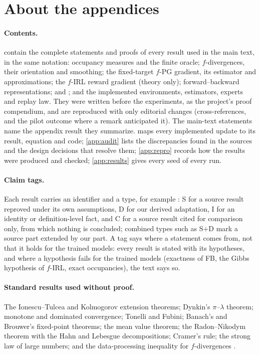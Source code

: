 \section{About the appendices}\label{app:proofs-intro}

\paragraph{Contents.}
 contain the complete statements and proofs of every result used in the main text, in the same notation: occupancy measures and the finite oracle; $f$-divergences, their orientation and smoothing; the fixed-target $f$-PG gradient, its estimator and approximations; the $f$-IRL reward gradient (theory only); forward--backward representations; \ERFB{} and \DMFB; and the implemented environments, estimators, experts and replay law.
They were written before the experiments, as the project's proof compendium, and are reproduced with only editorial changes (cross-references, and the pilot outcome where a remark anticipated it).
The main-text statements name the appendix result they summarize.
 maps every implemented update to its result, equation and code; \cref{app:audit} lists the discrepancies found in the sources and the design decisions that resolve them; \cref{app:repro} records how the results were produced and checked; \cref{app:results} gives every seed of every run.

\paragraph{Claim tags.}
Each result carries an identifier and a type, for example : \textsf{S} for a source result reproved under its own assumptions, \textsf{D} for our derived adaptation, \textsf{I} for an identity or definition-level fact, and \textsf{C} for a source result cited for comparison only, from which nothing is concluded; combined types such as \textsf{S+D} mark a source part extended by our part.
A tag says where a statement comes from, not that it holds for the trained models: every result is stated with its hypotheses, and where a hypothesis fails for the trained models (exactness of FB, the Gibbs hypothesis of $f$-IRL, exact occupancies), the text says so.

\paragraph{Standard results used without proof.}
The Ionescu--Tulcea and Kolmogorov extension theorems; Dynkin's $\pi$--$\lambda$ theorem; monotone and dominated convergence; Tonelli and Fubini; Banach's and Brouwer's fixed-point theorems; the mean value theorem; the Radon--Nikodym theorem with the Hahn and Lebesgue decompositions; Cramer's rule; the strong law of large numbers; and the data-processing inequality for $f$-divergences \citep{csiszar1967information}.

